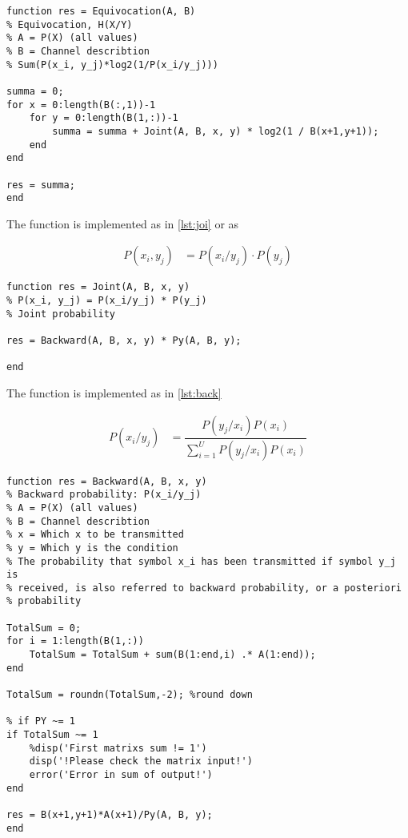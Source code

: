 \documentclass[Main]{subfiles}
\begin{document}
\begin{lstlisting}[caption=Equivocation -- H(Y/X), style=Code-Matlab, label=lst:equ]
function res = Equivocation(A, B)
% Equivocation, H(X/Y)
% A = P(X) (all values)
% B = Channel describtion
% Sum(P(x_i, y_j)*log2(1/P(x_i/y_j)))

summa = 0;
for x = 0:length(B(:,1))-1
    for y = 0:length(B(1,:))-1
        summa = summa + Joint(A, B, x, y) * log2(1 / B(x+1,y+1));
    end
end

res = summa;
end
\end{lstlisting}
The function  is implemented as in \codeTitle \ref{lst:joi} or as

\begin{align}
P(x_i, y_j) &= P(x_i/y_j) \cdot P(y_j)
\end{align}

\begin{lstlisting}[caption=Joint probability, style=Code-Matlab, label=lst:joi]
function res = Joint(A, B, x, y)
% P(x_i, y_j) = P(x_i/y_j) * P(y_j)
% Joint probability

res = Backward(A, B, x, y) * Py(A, B, y);

end
\end{lstlisting}
The function  is implemented as in \codeTitle \ref{lst:back}

\begin{align}
P(x_i/y_j) &= \dfrac{P(y_j/x_i)P(x_i)}{\sum_{i=1}^U P(y_j/x_i)P(x_i)}
\end{align}

\begin{lstlisting}[caption=Backward probability, style=Code-Matlab, label=lst:back]
function res = Backward(A, B, x, y)
% Backward probability: P(x_i/y_j)
% A = P(X) (all values)
% B = Channel describtion
% x = Which x to be transmitted
% y = Which y is the condition
% The probability that symbol x_i has been transmitted if symbol y_j is 
% received, is also referred to backward probability, or a posteriori 
% probability

TotalSum = 0;
for i = 1:length(B(1,:))
    TotalSum = TotalSum + sum(B(1:end,i) .* A(1:end));
end

TotalSum = roundn(TotalSum,-2); %round down

% if PY ~= 1
if TotalSum ~= 1
    %disp('First matrixs sum != 1')
    disp('!Please check the matrix input!')
    error('Error in sum of output!')
end

res = B(x+1,y+1)*A(x+1)/Py(A, B, y);
end
\end{lstlisting}
\end{document}
